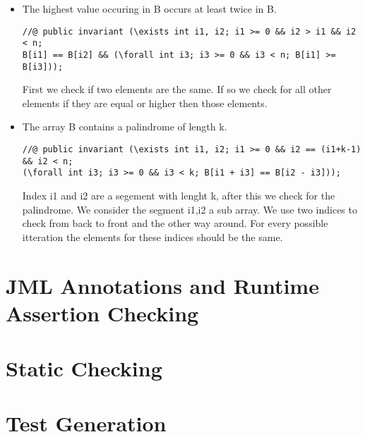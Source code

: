 \documentclass[a4paper]{article}
\begin{document}
\begin{itemize}
	\item The highest value occuring in B occurs at least twice in B.
	\begin{lstlisting}
//@ public invariant (\exists int i1, i2; i1 >= 0 && i2 > i1 && i2 < n;
B[i1] == B[i2] && (\forall int i3; i3 >= 0 && i3 < n; B[i1] >= B[i3]));	
	\end{lstlisting}
	First we check if two elements are the same. If so we check for all other elements if they are equal or higher then those elements.
	
	\item The array B contains a palindrome of length k.
	\begin{lstlisting}
//@ public invariant (\exists int i1, i2; i1 >= 0 && i2 == (i1+k-1) && i2 < n;
(\forall int i3; i3 >= 0 && i3 < k; B[i1 + i3] == B[i2 - i3]));	
	\end{lstlisting}
	Index i1 and i2 are a segement with lenght k, after this we check for the palindrome. We consider the segment i1,i2 a sub array. We use two indices to check from back to front and the other way around. For every possible itteration the elements for these indices should be the same.
\end{itemize}

\section{JML Annotations and Runtime Assertion Checking}


\section{Static Checking}


\section{Test Generation}
\end{document}
